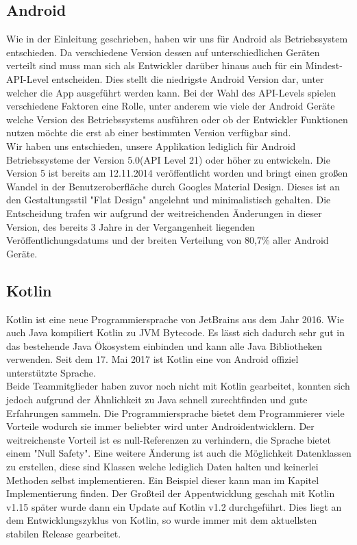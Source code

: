 \subsection{Android}
Wie in der Einleitung geschrieben, haben wir uns für Android als Betriebssystem entschieden. Da verschiedene Version dessen auf unterschiedlichen Geräten verteilt sind
muss man sich als Entwickler darüber hinaus auch für ein Mindest-API-Level entscheiden. Dies stellt die niedrigste Android Version dar, unter welcher die App ausgeführt werden kann.
Bei der Wahl des API-Levels spielen verschiedene Faktoren eine Rolle, unter anderem wie viele der Android Geräte welche Version des Betriebssystems ausführen oder ob der Entwickler
Funktionen nutzen möchte die erst ab einer bestimmten Version verfügbar sind.\\
Wir haben uns entschieden, unsere Applikation lediglich für Android Betriebssysteme der Version 5.0(API Level 21) oder höher zu entwickeln.
Die Version 5 ist bereits am 12.11.2014 veröffentlicht worden und bringt einen großen Wandel in der Benutzeroberfläche durch Googles Material Design.
Dieses ist an den Gestaltungsstil "Flat Design" angelehnt und minimalistisch gehalten. Die Entscheidung trafen wir aufgrund der weitreichenden 
Änderungen in dieser Version, des bereits 3 Jahre in der Vergangenheit liegenden Veröffentlichungsdatums und der breiten Verteilung von 80,7\% aller Android Geräte.

\subsection{Kotlin}

Kotlin ist eine neue Programmiersprache von JetBrains aus dem Jahr 2016. Wie auch Java kompiliert Kotlin zu JVM Bytecode. Es lässt sich dadurch sehr gut in das bestehende Java Ökosystem einbinden und kann alle Java Bibliotheken verwenden. Seit dem 17. Mai 2017 ist Kotlin eine von Android offiziel unterstützte Sprache.\cite{kotlinrelease}\\

Beide Teammitglieder haben zuvor noch nicht mit Kotlin gearbeitet, konnten sich jedoch aufgrund der Ähnlichkeit zu Java schnell zurechtfinden und gute Erfahrungen sammeln. Die Programmiersprache bietet dem Programmierer viele Vorteile wodurch sie immer beliebter wird unter Androidentwicklern. Der weitreichenste Vorteil ist es  null-Referenzen zu verhindern, die Sprache bietet einem "Null Safety". Eine weitere Änderung ist auch die Möglichkeit Datenklassen zu erstellen, diese sind Klassen welche lediglich Daten halten und keinerlei Methoden selbst implementieren. Ein Beispiel dieser kann man im Kapitel Implementierung finden. Der Großteil der Appentwicklung geschah mit Kotlin v1.15 später wurde dann ein Update auf Kotlin v1.2 durchgeführt. Dies liegt an dem Entwicklungszyklus von Kotlin, so wurde immer mit dem aktuellsten stabilen Release gearbeitet.\cite{kotlin}


